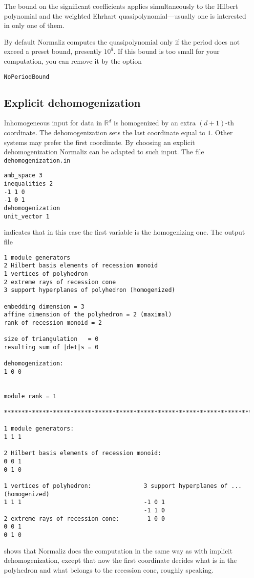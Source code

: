 \documentclass[12pt,a4paper]{scrartcl}
\theoremstyle{definition}
\def\RR{{\mathbb R}}
\begin{document}
The bound on the significant coefficients applies simultaneously to the Hilbert polynomial and the weighted Ehrhart quasipolynomial---usually one is interested in only one of them.

By default Normaliz computes the quasipolynomial only if the period does not exceed a preset bound, presently $10^6$. If this bound is too small for your computation, you can remove it by the option
\begin{Verbatim}
NoPeriodBound
\end{Verbatim}



\subsection{Explicit dehomogenization}\label{dehom_ex}
Inhomogeneous input for data in $\RR^{d}$ is homogenized by an extra $(d+1)$-th coordinate. The dehomogenization sets the last coordinate equal to $1$. Other systems may prefer the first coordinate. By choosing an explicit dehomogenization Normaliz can be adapted to such input. The file \verb|dehomogenization.in|
\begin{Verbatim}
amb_space 3
inequalities 2
-1 1 0
-1 0 1
dehomogenization
unit_vector 1
\end{Verbatim}
indicates that in this case the first variable is the homogenizing one. The output file
\begin{Verbatim}
1 module generators
2 Hilbert basis elements of recession monoid
1 vertices of polyhedron
2 extreme rays of recession cone
3 support hyperplanes of polyhedron (homogenized)

embedding dimension = 3
affine dimension of the polyhedron = 2 (maximal)
rank of recession monoid = 2

size of triangulation   = 0
resulting sum of |det|s = 0

dehomogenization:
1 0 0 


module rank = 1

***********************************************************************

1 module generators:
1 1 1

2 Hilbert basis elements of recession monoid:
0 0 1
0 1 0

1 vertices of polyhedron:               3 support hyperplanes of ... (homogenized)
1 1 1                                   -1 0 1
                                        -1 1 0
2 extreme rays of recession cone:        1 0 0
0 0 1
0 1 0
\end{Verbatim}
shows that Normaliz does the computation in the same way as with implicit dehomogenization, except that now the first coordinate decides what is in the polyhedron and what belongs to the recession cone, roughly speaking.
\end{document}
